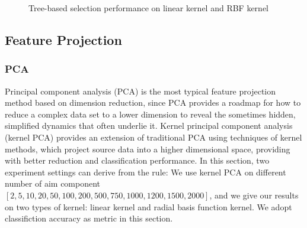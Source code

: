 \documentclass{article}
\begin{document}
\begin{figure}[htbp]
	\centering
	\quad
	\caption{Tree-based selection performance on linear kernel and RBF kernel}
	\label{Figure4}
\end{figure}

\subsection{Feature Projection}
\subsubsection{PCA}
Principal component analysis (PCA) is the most typical feature projection method based on dimension reduction, since PCA provides a roadmap for how to reduce a complex data set to a lower dimension to reveal the sometimes hidden, simplified dynamics that often underlie it. Kernel principal component analysis (kernel PCA) provides an extension of traditional PCA using techniques of kernel methods, which project source data into a higher dimensional space, providing with better reduction and classification performance. In this section, two experiment settings can derive from the rule: We use kernel PCA on different number of aim component $[2, 5, 10, 20, 50, 100, 200, 500, 750, 1000, 1200, 1500, 2000]$, and we give our results on two types of kernel: linear kernel and radial basis function kernel. We adopt classifiction accuracy as metric in this section.
\end{document}
